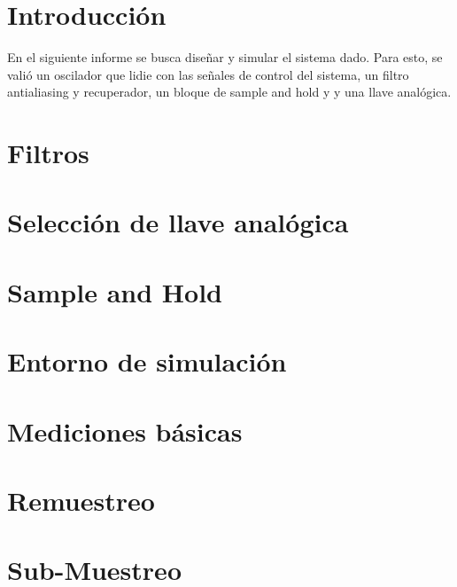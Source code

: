 







\tableofcontents
\newpage


\section{Introducción}

En el siguiente informe se busca diseñar y simular el sistema dado. Para esto, se valió un oscilador que lidie con las señales de control del sistema, un filtro antialiasing y recuperador, un bloque de sample and hold y y una llave analógica.

\section{Filtros}
	\label{Ejercicio-2}
	

\pagebreak
\section{Selección de llave analógica}
	\label{Ejercicio-3}
	

\pagebreak	
\section{Sample and Hold}
	\label{Ejercicio-4}
	
	


\pagebreak

\section{Entorno de simulación}
	\label{Ejercicio-5}
	
	
\pagebreak

\section{Mediciones básicas}
	\label{Ejercicio-6}
	
	
\pagebreak

\section{Remuestreo}
	\label{Ejercicio-7}
	
	
\pagebreak	
\section{Sub-Muestreo}
	\label{Ejercicio-8}
	
	
